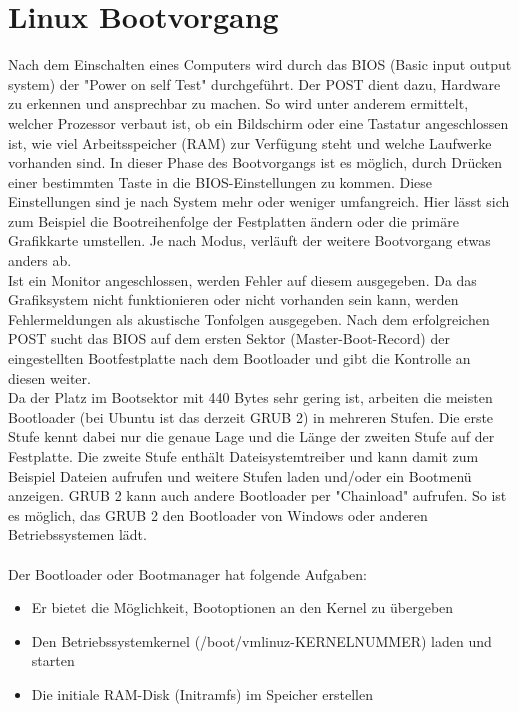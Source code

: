 \documentclass[a4paper]{article}
\begin{document}
\section{Linux Bootvorgang}

Nach dem Einschalten eines Computers wird durch das BIOS (Basic input output system) der "Power on self Test" durchgeführt. Der POST dient dazu, Hardware zu erkennen und ansprechbar zu machen. So wird unter anderem ermittelt, welcher Prozessor verbaut ist, ob ein Bildschirm oder eine Tastatur angeschlossen ist, wie viel Arbeitsspeicher (RAM) zur Verfügung steht und welche Laufwerke vorhanden sind. In dieser Phase des Bootvorgangs ist es möglich, durch Drücken einer bestimmten Taste in die BIOS-Einstellungen zu kommen. Diese Einstellungen sind je nach System mehr oder weniger umfangreich. Hier lässt sich zum Beispiel die Bootreihenfolge der Festplatten ändern oder die primäre Grafikkarte umstellen. Je nach Modus, verläuft der weitere Bootvorgang etwas anders ab.\\
Ist ein Monitor angeschlossen, werden Fehler auf diesem ausgegeben. Da das Grafiksystem nicht funktionieren oder nicht vorhanden sein kann, werden Fehlermeldungen als akustische Tonfolgen ausgegeben. Nach dem erfolgreichen POST sucht das BIOS auf dem ersten Sektor (Master-Boot-Record) der eingestellten Bootfestplatte nach dem Bootloader und gibt die Kontrolle an diesen weiter.\\
Da der Platz im Bootsektor mit 440 Bytes sehr gering ist, arbeiten die meisten Bootloader (bei Ubuntu ist das derzeit GRUB 2) in mehreren Stufen. Die erste Stufe kennt dabei nur die genaue Lage und die Länge der zweiten Stufe auf der Festplatte. Die zweite Stufe enthält Dateisystemtreiber und kann damit zum Beispiel Dateien aufrufen und weitere Stufen laden und/oder ein Bootmenü anzeigen. GRUB 2 kann auch andere Bootloader per "Chainload" aufrufen. So ist es möglich, das GRUB 2 den Bootloader von Windows oder anderen Betriebssystemen lädt.\\\\
Der Bootloader oder Bootmanager hat folgende Aufgaben:
	\begin{itemize}
    \item Er bietet die Möglichkeit, Bootoptionen an den Kernel zu übergeben
    \item Den Betriebssystemkernel (/boot/vmlinuz-KERNELNUMMER) laden und starten
    \item Die initiale RAM-Disk (Initramfs) im Speicher erstellen
    \end{itemize}
\end{document}
